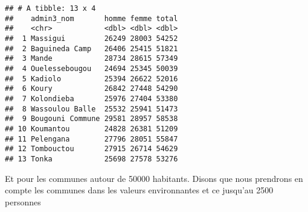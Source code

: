 \documentclass[]{book}
\newenvironment{Shaded}{\begin{snugshade}}{\end{snugshade}}
\newcommand{\KeywordTok}[1]{\textcolor[rgb]{0.13,0.29,0.53}{\textbf{#1}}}
\newcommand{\DataTypeTok}[1]{\textcolor[rgb]{0.13,0.29,0.53}{#1}}
\newcommand{\DecValTok}[1]{\textcolor[rgb]{0.00,0.00,0.81}{#1}}
\newcommand{\StringTok}[1]{\textcolor[rgb]{0.31,0.60,0.02}{#1}}
\newcommand{\CommentTok}[1]{\textcolor[rgb]{0.56,0.35,0.01}{\textit{#1}}}
\newcommand{\OperatorTok}[1]{\textcolor[rgb]{0.81,0.36,0.00}{\textbf{#1}}}
\newcommand{\NormalTok}[1]{#1}
\begin{document}
\begin{Shaded}
\end{Shaded}

\begin{verbatim}
## # A tibble: 13 x 4
##    admin3_nom       homme femme total
##    <chr>            <dbl> <dbl> <dbl>
##  1 Massigui         26249 28003 54252
##  2 Baguineda Camp   26406 25415 51821
##  3 Mande            28734 28615 57349
##  4 Ouelessebougou   24694 25345 50039
##  5 Kadiolo          25394 26622 52016
##  6 Koury            26842 27448 54290
##  7 Kolondieba       25976 27404 53380
##  8 Wassoulou Balle  25532 25941 51473
##  9 Bougouni Commune 29581 28957 58538
## 10 Koumantou        24828 26381 51209
## 11 Pelengana        27796 28051 55847
## 12 Tombouctou       27915 26714 54629
## 13 Tonka            25698 27578 53276
\end{verbatim}

Et pour les communes autour de 50000 habitants. Disons que nous
prendrons en compte les communes dans les valeurs environnantes et ce
jusqu'au 2500 personnes
\end{document}
